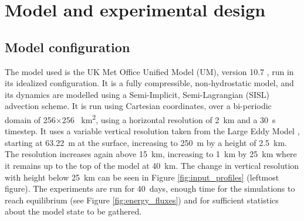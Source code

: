 \documentclass[11pt,a4paper]{article}
\begin{document}
\section{Model and experimental design}

\subsection{Model configuration}


The model used is the UK Met Office Unified Model (UM), version 10.7 \parencite{walters2017met}, run in its idealized configuration. It is a fully compressible, non-hydrostatic model, and its dynamics are modelled using a Semi-Implicit, Semi-Lagrangian (SISL) advection scheme. It is run using Cartesian coordinates, over a bi-periodic domain of 256$\times$256 \SI{}{km^2}, using a horizontal resolution of \SI{2}{km} and a \SI{30}{s} timestep. It uses a variable vertical resolution taken from the Large Eddy Model \parencite{petch2001sensitivity}, starting at \SI{63.22}{m} at the surface, increasing to \SI{250}{m} by a height of \SI{2.5}{km}. The resolution increases again above \SI{15}{km}, increasing to \SI{1}{km} by \SI{25}{km} where it remains up to the top of the model at \SI{40}{km}. The change in vertical resolution with height below \SI{25}{km} can be seen in Figure \ref{fig:input_profiles} (leftmost figure).
The experiments are run for \SI{40}{days}, enough time for the simulations to reach equilibrium (see Figure \ref{fig:energy_fluxes}) and for sufficient statistics about the model state to be gathered. 
\end{document}
